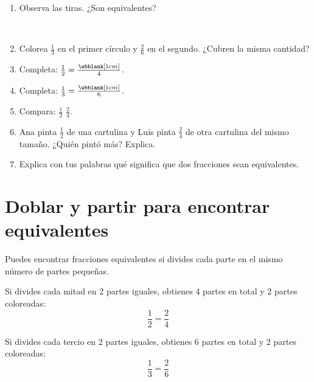 \begin{wbpractice}
\begin{enumerate}
\item Observa las tiras. ¿Son equivalentes? 

\begin{center}
\\[2pt]
\end{center}

\item Colorea $\frac{1}{3}$ en el primer círculo y $\frac{2}{6}$ en el segundo. ¿Cubren la misma cantidad? 

\begin{center}
\hspace{1cm}
\end{center}

\item Completa: $\frac{1}{2}=\frac{\wbblank[1cm]}{4}$. 

\item Completa: $\frac{1}{3}=\frac{\wbblank[1cm]}{6}$. 

\item Compara: $\frac{1}{2}$ \wbblank[1.5cm] $\frac{2}{4}$. 

\item Ana pinta $\frac{1}{2}$ de una cartulina y Luis pinta $\frac{2}{4}$ de otra cartulina del mismo tamaño. ¿Quién pintó más? Explica. 

\item Explica con tus palabras qué significa que dos fracciones sean equivalentes. 
\end{enumerate}
\end{wbpractice}

\section{Doblar y partir para encontrar equivalentes}

Puedes encontrar fracciones equivalentes si divides cada parte en el mismo número de partes pequeñas.

Si divides cada mitad en 2 partes iguales, obtienes 4 partes en total y 2 partes coloreadas:
\[
\frac{1}{2}=\frac{2}{4}
\]

Si divides cada tercio en 2 partes iguales, obtienes 6 partes en total y 2 partes coloreadas:
\[
\frac{1}{3}=\frac{2}{6}
\]

